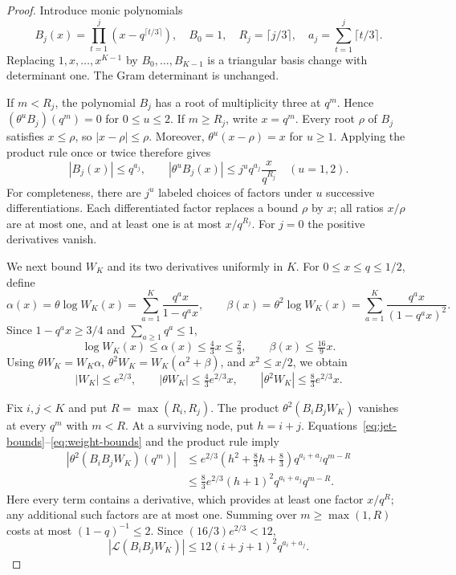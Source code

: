 \documentclass[11pt]{article}
\theoremstyle{remark}
\newcommand{\Lcal}{\mathcal L}
\begin{document}
\begin{proof}
Introduce monic polynomials
\[
 B_j(x)=\prod_{t=1}^j(x-q^{\lceil t/3\rceil}),\quad B_0=1,
 \quad R_j=\lceil j/3\rceil,\quad
 a_j=\sum_{t=1}^j\lceil t/3\rceil.
\]
Replacing $1,x,\ldots,x^{K-1}$ by $B_0,\ldots,B_{K-1}$ is a triangular
basis change with determinant one. The Gram determinant is unchanged.

If $m<R_j$, the polynomial $B_j$ has a root of multiplicity three at
$q^m$. Hence $(\theta^uB_j)(q^m)=0$ for $0\le u\le2$. If $m\ge R_j$,
write $x=q^m$. Every root $\rho$ of $B_j$ satisfies $x\le\rho$, so
$|x-\rho|\le\rho$. Moreover, $\theta^u(x-\rho)=x$ for $u\ge1$.
Applying the product rule once or twice therefore gives
\begin{equation}\label{eq:jet-bounds}
 |B_j(x)|\le q^{a_j},\qquad
 |\theta^uB_j(x)|\le j^uq^{a_j}\frac{x}{q^{R_j}}\quad(u=1,2).
\end{equation}
For completeness, there are $j^u$ labeled choices of factors under $u$
successive differentiations. Each differentiated factor replaces a
bound $\rho$ by $x$; all ratios $x/\rho$ are at most one, and at least
one is at most $x/q^{R_j}$. For $j=0$ the positive derivatives vanish.

We next bound $W_K$ and its two derivatives uniformly in $K$.
For $0\le x\le q\le1/2$, define
\[
 \alpha(x)=\theta\log W_K(x)
   =\sum_{a=1}^K\frac{q^ax}{1-q^ax},\qquad
 \beta(x)=\theta^2\log W_K(x)
   =\sum_{a=1}^K\frac{q^ax}{(1-q^ax)^2}.
\]
Since $1-q^ax\ge3/4$ and $\sum_{a\ge1}q^a\le1$,
\[
 \log W_K(x)\le\alpha(x)\le\tfrac43x\le\tfrac23,
 \qquad \beta(x)\le\tfrac{16}{9}x.
\]
Using $\theta W_K=W_K\alpha$, $\theta^2W_K=W_K(\alpha^2+\beta)$,
and $x^2\le x/2$, we obtain
\begin{equation}\label{eq:weight-bounds}
 |W_K|\le e^{2/3},\qquad
 |\theta W_K|\le\tfrac43e^{2/3}x,\qquad
 |\theta^2W_K|\le\tfrac83e^{2/3}x.
\end{equation}

Fix $i,j<K$ and put $R=\max(R_i,R_j)$. The product
$\theta^2(B_iB_jW_K)$ vanishes at every $q^m$ with $m<R$. At a surviving
node, put $h=i+j$. Equations~\eqref{eq:jet-bounds}--\eqref{eq:weight-bounds}
and the product rule imply
\begin{align*}
 |\theta^2(B_iB_jW_K)(q^m)|
 &\le e^{2/3}\left(h^2+\tfrac83h+\tfrac83\right)
       q^{a_i+a_j}q^{m-R}\\
 &\le\tfrac83e^{2/3}(h+1)^2q^{a_i+a_j}q^{m-R}.
\end{align*}
Here every term contains a derivative, which provides at least one
factor $x/q^R$; any additional such factors are at most one.
Summing over $m\ge\max(1,R)$ costs at most $(1-q)^{-1}\le2$.
Since $(16/3)e^{2/3}<12$,
\begin{equation}\label{eq:entry-bound}
 |\Lcal(B_iB_jW_K)|\le12(i+j+1)^2q^{a_i+a_j}.
\end{equation}


\end{proof}
\end{document}
